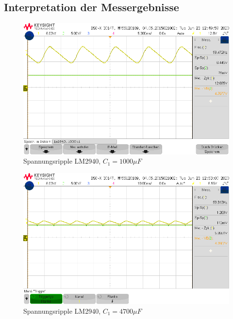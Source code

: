 \subsection{Interpretation der Messergebnisse}
\begin{figure}[H]
    \centering
    \includegraphics[width = \costumPicWidth]{Lab_5/Messungen/lm2940.1000u1.png}
    \caption{Spannungsripple LM2940, $C_1=1000\mu F$}
    \label{fig:V_rip_lm2940_1000u}
\end{figure}

\begin{figure}[H]
    \centering
    \includegraphics[width = \costumPicWidth]{Lab_5/Messungen/lm2940.min4701.png}
    \caption{Spannungsripple LM2940, $C_1=4700\mu F$}
    \label{fig:V_rip_lm2940_1000u}
\end{figure}

